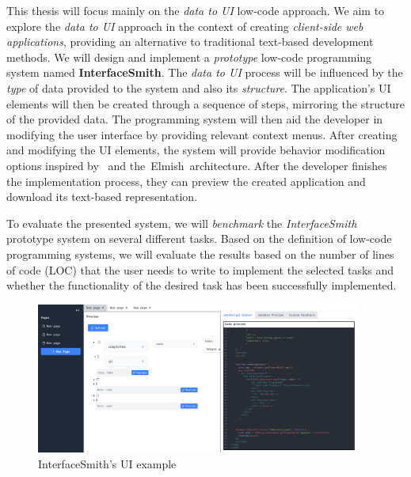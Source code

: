 This thesis will focus mainly on the \emph{data to UI} low-code approach.
We aim to explore the \emph{data to UI} approach in the context of creating \emph{client-side web applications}, providing an alternative to traditional text-based development methods.
We will design and implement a \emph{prototype} low-code programming system named \textbf{InterfaceSmith}.
The \emph{data to UI} process will be influenced by the \emph{type} of data provided to the system and also its \emph{structure}.
The application's UI elements will then be created through a sequence of steps, mirroring the structure of the provided data.
The programming system will then aid the developer in modifying the user interface by providing relevant context menus.
After creating and modifying the UI elements, the system will provide behavior modification options inspired by~\citet{eml} and the~Elmish~architecture\cite{elmish}.
After the developer finishes the implementation process, they can preview the created application and download its text-based representation.

To evaluate the presented system, we will \emph{benchmark} the \emph{InterfaceSmith} prototype system on several different tasks.
Based on the definition of low-code programming systems, we will evaluate the results based on the number of lines of code (LOC) that the user needs to write to implement the selected tasks and whether the functionality of the desired task has been successfully implemented.



\begin{figure}[htbp]
	\begin{center}
		\includegraphics[width=0.95\textwidth]{img/UIExample.pdf}
	\end{center}
	\caption{InterfaceSmith's UI example }
	\label{fig:prototype-teaser}
\end{figure}


